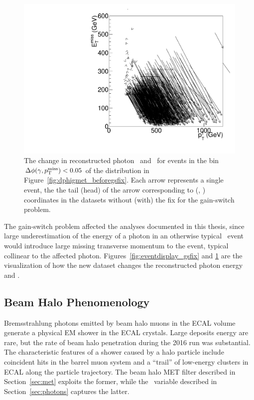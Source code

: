 \begin{figure}[htbp]
  \centering
  \includegraphics[width=0.48\linewidth]{Reconstruction/Figures/gsfix/movements.pdf}
  \caption{
    The change in reconstructed photon \pt\ and \met\ for events in the bin $\Delta \phi(\gamma, p_{\mathrm{T}}^\text{miss}) < 0.05$ of the distribution in Figure~\ref{fig:dphigmet_beforegsfix}. 
    Each arrow represents a single event, the the tail (head) of the arrow corresponding to (\ETg, \met) coordinates in the datasets without (with) the fix for the gain-switch problem.
  }
  \label{fig:ptshift_gsfix}
\end{figure}

The gain-switch problem affected the analyses documented in this thesis, since large underestimation of the energy of a photon in an otherwise typical \gj\ event would introduce large missing transverse momentum to the event, typical collinear to the affected photon. 
Figures~\ref{fig:eventdisplay_gsfix} and \ref{fig:ptshift_gsfix} are the visualization of how the new dataset changes the reconstructed photon energy and \met.

\subsection{Beam Halo Phenomenology}
\label{sec:halo}

Bremsstrahlung photons emitted by beam halo muons in the ECAL volume generate a physical EM shower in the ECAL crystals. 
Large deposits energy are rare, but the rate of beam halo penetration during the 2016 run was substantial. 
The characteristic features of a shower caused by a halo particle include coincident hits in the barrel muon system and a ``trail'' of low-energy clusters in ECAL along the particle trajectory. 
The beam halo MET filter described in Section~\ref{sec:met} exploits the former, while the \emip\ variable described in Section~\ref{sec:photons} captures the latter.

